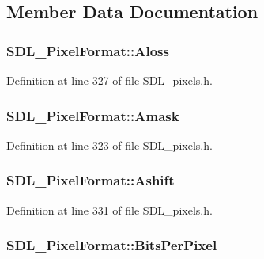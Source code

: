 \subsection{Member Data Documentation}
\hypertarget{struct_s_d_l___pixel_format_a660e95097874088292f1289a458efaa2}{
\subsubsection[{Aloss}]{ S\-D\-L\-\_\-\-Pixel\-Format\-::\-Aloss}}\label{struct_s_d_l___pixel_format_a660e95097874088292f1289a458efaa2}


Definition at line 327 of file S\-D\-L\-\_\-pixels.\-h.

\hypertarget{struct_s_d_l___pixel_format_a6cdaf31f6cb153fefda47fa6b8368c0e}{
\subsubsection[{Amask}]{ S\-D\-L\-\_\-\-Pixel\-Format\-::\-Amask}}\label{struct_s_d_l___pixel_format_a6cdaf31f6cb153fefda47fa6b8368c0e}


Definition at line 323 of file S\-D\-L\-\_\-pixels.\-h.

\hypertarget{struct_s_d_l___pixel_format_ac3c4ffa0de1f2c94040340deede3bf46}{
\subsubsection[{Ashift}]{ S\-D\-L\-\_\-\-Pixel\-Format\-::\-Ashift}}\label{struct_s_d_l___pixel_format_ac3c4ffa0de1f2c94040340deede3bf46}


Definition at line 331 of file S\-D\-L\-\_\-pixels.\-h.

\hypertarget{struct_s_d_l___pixel_format_aac533fae3043ef44df01108248e111d8}{
\subsubsection[{Bits\-Per\-Pixel}]{ S\-D\-L\-\_\-\-Pixel\-Format\-::\-Bits\-Per\-Pixel}}\label{struct_s_d_l___pixel_format_aac533fae3043ef44df01108248e111d8}


